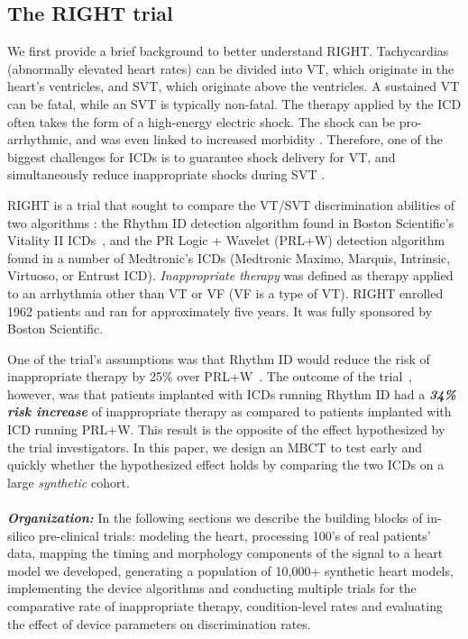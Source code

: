 \subsection{The RIGHT trial}
\label{sec:right}
We first provide a brief background to better understand RIGHT. Tachycardias (abnormally elevated heart rates) can be divided into VT, which originate in the heart's ventricles, 
and SVT, which originate above the ventricles.
A sustained VT can be fatal, while an SVT is typically non-fatal.
The therapy applied by the ICD often takes the form of a high-energy electric shock.
The shock can be pro-arrhythmic, and was even linked to increased morbidity \cite{shock_mortality}.
Therefore, one of the biggest challenges for ICDs is to guarantee shock delivery for VT, and simultaneously reduce inappropriate shocks during SVT \cite{Ellenbogen11_Pacingbook}.

RIGHT is a trial that sought to compare the VT/SVT discrimination abilities of two algorithms \cite{GoldABBTB11_RIGHTresults}: 
the Rhythm ID detection algorithm found in Boston Scientific's Vitality II ICDs~\cite{compass},
and the PR Logic + Wavelet (PRL+W) detection algorithm found in a number of Medtronic's ICDs (Medtronic Maximo,
Marquis, Intrinsic, Virtuoso, or Entrust ICD).
\emph{Inappropriate therapy} was defined as therapy applied to an arrhythmia other than VT or VF (VF is a type of VT).
RIGHT enrolled 1962 patients and ran for approximately five years.
It was fully sponsored by Boston Scientific. 

One of the trial's assumptions was that Rhythm ID would reduce the risk of inappropriate therapy by 25\% over PRL+W~\cite{Berger06_RIGHT}.
The outcome of the trial~\cite{GoldABBTB11_RIGHTresults}, however, was that patients implanted with ICDs running Rhythm ID had a \emph{\textbf{34\% risk increase}} of inappropriate therapy as compared to patients implanted with ICD running PRL+W. 
This result  is the opposite of the effect hypothesized by the trial investigators. 
In this paper, we design an MBCT to test early and quickly whether the hypothesized effect holds by comparing the two ICDs on a large \emph{synthetic} cohort.\\\\
\textbf{\emph{Organization:}} In the following sections we describe the building blocks of in-silico pre-clinical trials: modeling the heart, processing 100's of real patients' data, mapping the timing and morphology components of the signal to a heart model we developed, generating a population of 10,000+ synthetic heart models, implementing the device algorithms and conducting multiple trials for the comparative rate of inappropriate therapy, condition-level rates and evaluating the effect of device parameters on discrimination rates.

